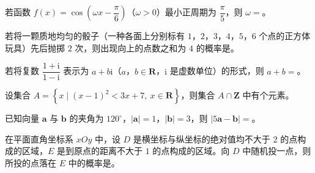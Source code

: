 


\begin{question}
若函数 $f(x)=\cos\left(\omega x-\dfrac{\pi}6\right)$（$\omega>0$）最小正周期为 $\dfrac{\pi}5$，则 $\omega=$\gkblank{}。

\end{question}
\begin{question}
若将一颗质地均匀的骰子（一种各面上分别标有 $1$，$2$，$3$，$4$，$5$，$6$ 个点的正方体玩具）先后抛掷 $2$ 次，则出现向上的点数之和为 $4$ 的概率是\gkblank{}。

\end{question}
\begin{question}
若将复数 $\dfrac{1+\mathrm i}{1-\mathrm i}$ 表示为 $a+b\mathrm i$（$a$，$b\in\mathbf R$，$\mathrm i$ 是虚数单位）的形式，则 $a+b=$\gkblank{}。

\end{question}
\begin{question}
设集合 $A=\left\{x\mid (x-1)^2<3x+7,\ x\in\mathbf R\right\}$，则集合 $A\cap\mathbf Z$ 中有\gkblank{}个元素。

\end{question}
\begin{question}
已知向量 $\boldsymbol a$ 与 $\boldsymbol b$ 的夹角为 $120^\circ$，$|\boldsymbol a|=1$，$|\boldsymbol b|=3$，则 $|5\boldsymbol a-\boldsymbol b|=$\gkblank{}。

\end{question}
\begin{question}
在平面直角坐标系 $xOy$ 中，设 $D$ 是横坐标与纵坐标的绝对值均不大于 $2$ 的点构成的区域，$E$ 是到原点的距离不大于 $1$ 的点构成的区域。向 $D$ 中随机投一点，则所投的点落在 $E$ 中的概率是\gkblank{}。

\Needspace{0.4\textheight}
\end{question}
